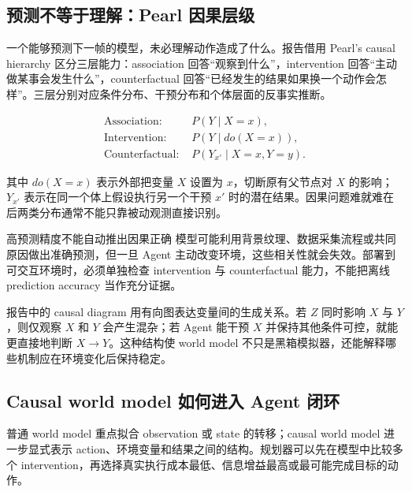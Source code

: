\subsection{预测不等于理解：Pearl 因果层级}

一个能够预测下一帧的模型，未必理解动作造成了什么。报告借用 Pearl's causal hierarchy 区分三层能力：association 回答“观察到什么”，intervention 回答“主动做某事会发生什么”，counterfactual 回答“已经发生的结果如果换一个动作会怎样”。三层分别对应条件分布、干预分布和个体层面的反事实推断。

$$
\begin{aligned}
\text{Association: }& P(Y\mid X=x),\\
\text{Intervention: }& P(Y\mid do(X=x)),\\
\text{Counterfactual: }& P(Y_{x'}\mid X=x,Y=y).
\end{aligned}
$$

其中 $do(X=x)$ 表示外部把变量 $X$ 设置为 $x$，切断原有父节点对 $X$ 的影响；$Y_{x'}$ 表示在同一个体上假设执行另一个干预 $x'$ 时的潜在结果。因果问题难就难在后两类分布通常不能只靠被动观测直接识别。


\begin{warningbox}{高预测精度不能自动推出因果正确}
模型可能利用背景纹理、数据采集流程或共同原因做出准确预测，但一旦 Agent 主动改变环境，这些相关性就会失效。部署到可交互环境时，必须单独检查 intervention 与 counterfactual 能力，不能把离线 prediction accuracy 当作充分证据。
\end{warningbox}

报告中的 causal diagram 用有向图表达变量间的生成关系。若 $Z$ 同时影响 $X$ 与 $Y$，则仅观察 $X$ 和 $Y$ 会产生混杂；若 Agent 能干预 $X$ 并保持其他条件可控，就能更直接地判断 $X\rightarrow Y$。这种结构使 world model 不只是黑箱模拟器，还能解释哪些机制应在环境变化后保持稳定。


\subsection{Causal world model 如何进入 Agent 闭环}

普通 world model 重点拟合 observation 或 state 的转移；causal world model 进一步显式表示 action、环境变量和结果之间的结构。规划器可以先在模型中比较多个 intervention，再选择真实执行成本最低、信息增益最高或最可能完成目标的动作。

